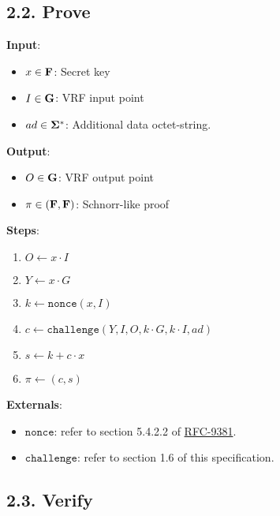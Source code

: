 \documentclass[
]{article}
\providecommand{\tightlist}{%
  \setlength{\itemsep}{0pt}\setlength{\parskip}{0pt}}
\begin{document}
\subsection{2.2. Prove}\label{prove}

\textbf{Input}:

\begin{itemize}
\tightlist
\item
  \(x \in \bold{F}\): Secret key
\item
  \(I \in \bold{G}\): VRF input point
\item
  \(ad \in \bold{\Sigma}^*\): Additional data octet-string.
\end{itemize}

\textbf{Output}:

\begin{itemize}
\tightlist
\item
  \(O \in \bold{G}\): VRF output point
\item
  \(\pi \in (\bold{F}, \bold{F})\): Schnorr-like proof
\end{itemize}

\textbf{Steps}:

\begin{enumerate}
\def\labelenumi{\arabic{enumi}.}
\tightlist
\item
  \(O \gets x \cdot I\)
\item
  \(Y \gets x \cdot G\)
\item
  \(k \gets \texttt{nonce}(x, I)\)
\item
  \(c \gets \texttt{challenge}(Y, I, O, k \cdot G, k \cdot I, ad)\)
\item
  \(s \gets k + c \cdot x\)
\item
  \(\pi \gets (c, s)\)
\end{enumerate}

\textbf{Externals}:

\begin{itemize}
\tightlist
\item
  \(\texttt{nonce}\): refer to section 5.4.2.2 of
  \href{https://datatracker.ietf.org/doc/rfc9381}{RFC-9381}.
\item
  \(\texttt{challenge}\): refer to section 1.6 of this specification.
\end{itemize}

\subsection{2.3. Verify}\label{verify}
\end{document}

